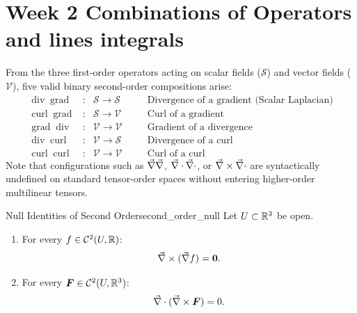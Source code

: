 

\chapter{Week 2 Combinations of Operators and lines integrals}

From the three first-order operators acting on scalar fields ($\mathcal{S}$) and vector fields ($\mathcal{V}$), five valid binary second-order compositions arise:
\begin{equation*}
    \begin{array}{rcccl}
        \operatorname{div} \operatorname{grad} &:& \mathcal{S} \longrightarrow \mathcal{S} & \quad & \text{Divergence of a gradient (Scalar Laplacian)} \\
        \operatorname{curl} \operatorname{grad} &:& \mathcal{S} \longrightarrow \mathcal{V} & \quad & \text{Curl of a gradient} \\
        \operatorname{grad} \operatorname{div}  &:& \mathcal{V} \longrightarrow \mathcal{V} & \quad & \text{Gradient of a divergence} \\
        \operatorname{div} \operatorname{curl}  &:& \mathcal{V} \longrightarrow \mathcal{S} & \quad & \text{Divergence of a curl} \\
        \operatorname{curl} \operatorname{curl} &:& \mathcal{V} \longrightarrow \mathcal{V} & \quad & \text{Curl of a curl}
    \end{array}
\end{equation*}
Note that configurations such as $\vec{\nabla} \vec{\nabla}$, $\vec{\nabla}\cdot \vec{\nabla}\cdot$, or $\vec{\nabla}\times \vec{\nabla}\cdot$ are syntactically undefined on standard tensor-order spaces without entering higher-order multilinear tensors.

\begin{theoreme}{Null Identities of Second Order}{second_order_null}
Let $U \subset \mathbb{R}^3$ be open.
\begin{enumerate}[label=\upshape(\Roman*)]
    \item For every $f \in \mathcal{C}^2(U, \mathbb{R})$:
    \begin{equation}
        \vec{\nabla}\times (\vec{\nabla} f) = \bm{0}.
    \end{equation}
    \item For every $\bm{F} \in \mathcal{C}^2(U, \mathbb{R}^3)$:
    \begin{equation}
        \vec{\nabla}\cdot (\vec{\nabla}\times \bm{F}) = 0.
    \end{equation}
\end{enumerate}
\end{theoreme}

